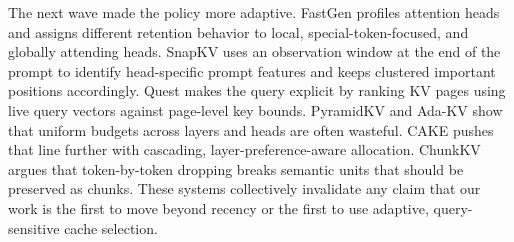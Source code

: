\documentclass[
]{article}
\begin{document}
The next wave made the policy more adaptive. FastGen
\citep{ge2023fastgen} profiles attention heads and
assigns different retention behavior to local, special-token-focused,
and globally attending heads. SnapKV
\citep{li2024snapkv} uses an observation window at the
end of the prompt to identify head-specific prompt features and keeps
clustered important positions accordingly. Quest
\citep{tang2024quest} makes the query explicit by
ranking KV pages using live query vectors against page-level key bounds.
PyramidKV \citep{cai2024pyramidkv} and Ada-KV
\citep{feng2024adakv} show that uniform budgets across
layers and heads are often wasteful. CAKE
\citep{qin2024cake} pushes that line further with
cascading, layer-preference-aware allocation. ChunkKV
\citep{liu2024chunkkv} argues that token-by-token
dropping breaks semantic units that should be preserved as chunks. These
systems collectively invalidate any claim that our work is the first to
move beyond recency or the first to use adaptive, query-sensitive cache
selection.
\end{document}
